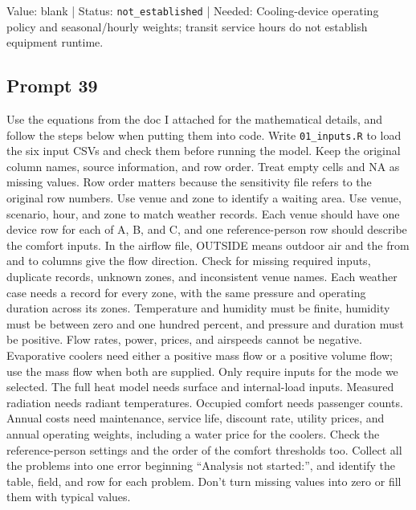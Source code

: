 Value: blank | Status: \nolinkurl{not_established} | Needed: Cooling-device operating policy and seasonal/hourly weights; transit service hours do not establish equipment runtime.

\subsection*{Prompt 39}
Use the equations from the doc I attached for the mathematical details, and follow the steps below when putting them into code. Write \nolinkurl{01_inputs.R} to load the six input CSVs and check them before running the model. Keep the original column names, source information, and row order. Treat empty cells and NA as missing values. Row order matters because the sensitivity file refers to the original row numbers.
Use venue and zone to identify a waiting area. Use venue, scenario, hour, and zone to match weather records. Each venue should have one device row for each of A, B, and C, and one reference-person row should describe the comfort inputs. In the airflow file, OUTSIDE means outdoor air and the from and to columns give the flow direction.
Check for missing required inputs, duplicate records, unknown zones, and inconsistent venue names. Each weather case needs a record for every zone, with the same pressure and operating duration across its zones. Temperature and humidity must be finite, humidity must be between zero and one hundred percent, and pressure and duration must be positive. Flow rates, power, prices, and airspeeds cannot be negative. Evaporative coolers need either a positive mass flow or a positive volume flow; use the mass flow when both are supplied.
Only require inputs for the mode we selected. The full heat model needs surface and internal-load inputs. Measured radiation needs radiant temperatures. Occupied comfort needs passenger counts. Annual costs need maintenance, service life, discount rate, utility prices, and annual operating weights, including a water price for the coolers. Check the reference-person settings and the order of the comfort thresholds too.
Collect all the problems into one error beginning “Analysis not started:”, and identify the table, field, and row for each problem. Don’t turn missing values into zero or fill them with typical values.


